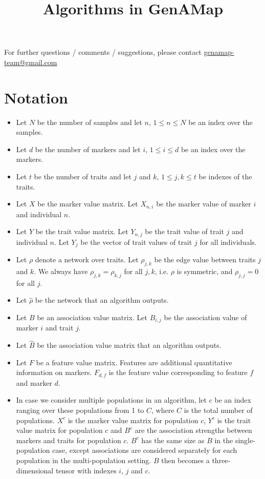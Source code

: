 \documentclass{article}
\title{Algorithms in GenAMap}
\author{}
\date{}
\begin{document}
\maketitle
\tableofcontents
\vspace{1cm}

For further questions / comments / suggestions, please contact \url{genamap-team@gmail.com}

\section{Notation}

\begin{itemize}
\item Let $N$ be the number of samples and let $n$, $1 \le n \le N$ be an index over the samples.
\item Let $d$ be the number of markers and let $i$, $1 \le i \le d$ be an index over the markers.
\item Let $t$ be the number of traits and let $j$ and $k$, $1 \le j,k \le t$ be indexes of the traits.
\item Let $X$ be the marker value matrix. Let $X_{n,i}$ be the marker value of marker $i$ and individual $n$. 
\item Let $Y$ be the trait value matrix. Let $Y_{n,j}$ be the trait value of trait $j$ and individual $n$. Let $Y_j$ be the vector of trait values of trait $j$ for all individuals.
\item Let $\rho$ denote a network over traits. Let $\rho_{j,k}$ be the edge value between traits $j$ and $k$. We always have $\rho_{j,k} = \rho_{k,j}$ for all $j,k$, i.e. $\rho$ is symmetric, and $\rho_{j,j} = 0$ for all $j$.
\item Let $\hat{\rho}$ be the network that an algorithm outputs.
\item Let $B$ be an association value matrix. Let $B_{i,j}$ be the association value of marker $i$ and trait $j$. 
\item Let $\hat{B}$ be the association value matrix that an algorithm outputs.
\item Let $F$ be a feature value matrix. Features are additional quantitative information on markers. $F_{d,f}$ is the feature value corresponding to feature $f$ and marker $d$.
\item In case we consider multiple populations in an algorithm, let $c$ be an index ranging over these populations from 1 to $C$, where $C$ is the total number of populations. $X^c$ is the marker value matrix for population $c$, $Y^c$ is the trait value matrix for population $c$ and $B^c$ are the association strengths between markers and traits for population $c$. $B^c$ has the same size as $B$ in the single-population case, except associations are considered separately for each population in the multi-population setting. $B$ then becomes a three-dimensional tensor with indexes $i$, $j$ and $c$.

\end{itemize}
\end{document}
